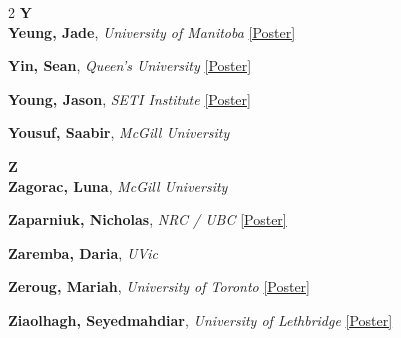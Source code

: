 \begin{small}
\begin{multicols}{2}
{\sffamily\bfseries\color{cascablue}\large Y}\\[2pt]

\textbf{Yeung, Jade}, {\footnotesize\textit{University of Manitoba}} \hyperref[poster-abstract-page-talk-241]{\scriptsize\textcolor{cascateal}{[Poster]}}\par
\textbf{Yin, Sean}, {\footnotesize\textit{Queen's University}} \hyperref[poster-abstract-page-talk-165]{\scriptsize\textcolor{cascateal}{[Poster]}}\par
\textbf{Young, Jason}, {\footnotesize\textit{SETI Institute}} \hyperref[poster-abstract-page-talk-92]{\scriptsize\textcolor{cascateal}{[Poster]}}\par
\textbf{Yousuf, Saabir}, {\footnotesize\textit{McGill University}}\par

{\sffamily\bfseries\color{cascablue}\large Z}\\[2pt]

\textbf{Zagorac, Luna}, {\footnotesize\textit{McGill University}}\par
\textbf{Zaparniuk, Nicholas}, {\footnotesize\textit{NRC / UBC}} \hyperref[poster-abstract-page-talk-337]{\scriptsize\textcolor{cascateal}{[Poster]}}\par
\textbf{Zaremba, Daria}, {\footnotesize\textit{UVic}}\par
\textbf{Zeroug, Mariah}, {\footnotesize\textit{University of Toronto}} \hyperref[poster-abstract-page-talk-296]{\scriptsize\textcolor{cascateal}{[Poster]}}\par
\textbf{Ziaolhagh, Seyedmahdiar}, {\footnotesize\textit{University of Lethbridge}} \hyperref[poster-abstract-page-talk-254]{\scriptsize\textcolor{cascateal}{[Poster]}}\par

\end{multicols}
\end{small}
